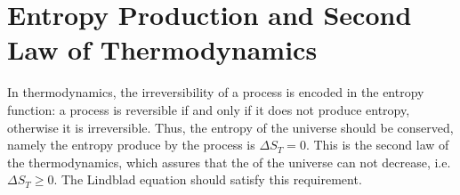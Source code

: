 \section{Entropy Production and Second Law of Thermodynamics}\label{C_entropy_production}

In thermodynamics, the irreversibility of a process is encoded in the entropy function: a process is reversible if and only if it does not produce entropy, otherwise it is irreversible. Thus, the entropy of the universe should be conserved, namely the entropy produce by the process is $\Delta S_T = 0$. This is the second law of the thermodynamics, which assures that the of the universe can not decrease, i.e. $\Delta S_T \geq 0$.
The Lindblad equation should satisfy this requirement.


